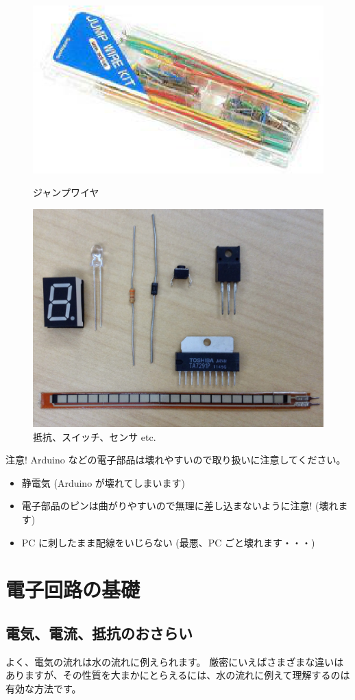 \documentclass[11pt,a4paper]{jarticle}
\begin{document}
\begin{figure}[h!]
 \begin{minipage}{0.5\columnwidth}
  \centering
  \includegraphics[height=0.4\columnwidth]{img/jumpwire.eps}
  \caption{ジャンプワイヤ}
 \end{minipage}
 \begin{minipage}{0.5\columnwidth}
  \centering
  \includegraphics[height=0.4\columnwidth]{img/parts.eps}
  \caption{抵抗、スイッチ、センサ etc.}
 \end{minipage}
\end{figure}

\begin{itembox}{注意!}
 Arduino などの電子部品は壊れやすいので取り扱いに注意してください。
 \begin{itemize}
  \item 静電気 (Arduino が壊れてしまいます)
  \item 電子部品のピンは曲がりやすいので無理に差し込まないように注意! (壊れます)
  \item PC に刺したまま配線をいじらない (最悪、PC ごと壊れます・・・)
 \end{itemize}
\end{itembox}

\section{電子回路の基礎}

\subsection*{電気、電流、抵抗のおさらい}
よく、電気の流れは水の流れに例えられます。
厳密にいえばさまざまな違いはありますが、その性質を大まかにとらえるには、水の流れに例えて理解するのは有効な方法です。
\end{document}
